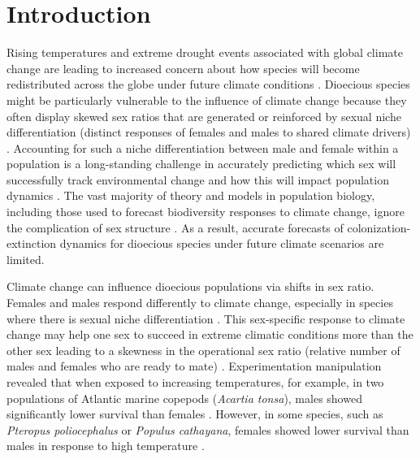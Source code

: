 \documentclass[11pt]{article}
\begin{document}
\section*{Introduction}
Rising temperatures and extreme drought events associated with global climate change are leading to increased concern about how species will become redistributed across the globe under future climate conditions \citep{bertrand2011changes,gamelon2017interactions,smith2024extreme}.
Dioecious species might be particularly vulnerable to the influence of climate change because they often display skewed sex ratios that are generated or reinforced by sexual niche differentiation (distinct responses of females and males to shared climate drivers) \citep{Tognetti2012}. 
Accounting for such a niche differentiation between male and female within a population is a long-standing challenge in accurately predicting which sex will successfully track environmental change and how this will impact population dynamics \citep{jones1999sex,gissi2023exploring}. 
The vast majority of theory and models in population biology, including those used to forecast biodiversity responses to climate change, ignore the complication of sex structure \citep{pottier2021sexual,ellis2017does}.
As a result, accurate forecasts of colonization-extinction dynamics for dioecious species under future climate scenarios are limited. 

Climate change can influence dioecious populations via shifts in sex ratio. 
Females and males respond differently to climate change, especially in species where there is sexual niche differentiation \citep{gissi2023exploring,gissi2023sex,hultine2016climate}. 
This sex-specific response to climate change may help one sex to succeed in extreme climatic conditions more than the other sex leading to a skewness in the operational sex ratio (relative number of males and females who are ready to mate) \citep{eberhart2017sex,zhao2012sex, burli2022environmental} .
Experimentation manipulation revealed that when exposed to increasing temperatures, for example, in two populations of Atlantic marine copepods (\textit{Acartia tonsa}), males showed significantly lower survival than females \citep{sasaki2019complex}.
However, in some species, such as \textit{Pteropus poliocephalus} or \textit {Populus cathayana}, females showed lower survival than males in response to high temperature \citep{welbergen2008climate,zhao2012sex}.
\end{document}
